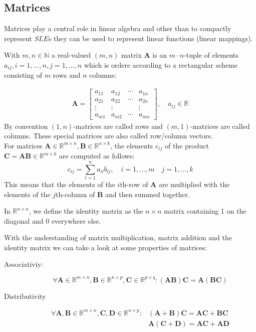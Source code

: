 \subsection*{Matrices}
Matrices play a central role in linear algebra and other than to compactly represent $SLE$s they can be used to represent linear functions (linear mappings).

\begin{definition}[Matrix]
    With $m,n \in \mathbb{N}$ a real-valued $(m,n)$ matrix \textbf{A} is an $m\cdot n$-tuple of elements $a_{ij}, i=1,\ldots,n, j=1,\ldots,n$ which is ordere according to a rectangular scheme consisting of $m$ rows and $n$ columns:
\end{definition}
\begin{align}
    \mathbf{A} =
    \begin{bmatrix}
        a_{11} & a_{12} & \cdots & a_{1n}\\
        a_{21} & a_{22} & \cdots & a_{2n}\\
        \vdots & \vdots &  & \vdots\\
        a_{m1} & a_{m2} & \cdots & a_{mn}
    \end{bmatrix}, \quad a_{ij} \in \mathbb{R}
\end{align}
By convention $(1,n)$-matrices are called rows and $(m,1)$-matrices are called columns. These special matrices are also called row/column vectors.\\
For matrices $\mathbf{A} \in \mathbb{R}^{m\times n},\mathbf{B} \in \mathbb{R}^{n\times k}$, the elements $c_{ij}$ of the product $\mathbf{C} = \mathbf{AB} \in \mathbb{R}^{m\times k}$ are computed as follows:
\[
    c_{ij}= \sum_{l=1}^{n}{a_{il}b_{lj}}, \quad i=1,\ldots,m \quad j=1, \ldots, k  
\]
This means that the elements of the $i$th-row of \textbf{A} are multiplied with the elements of the $j$th-column of \textbf{B} and then summed together.
\begin{definition}
    In $\mathbb{R}^{n\times n}$, we define the identity matrix as the $n \times n$ matrix containing 1 on the diagonal and 0 everywhere else. 
\end{definition}
With the understanding of matrix multiplication, matrix addition and the identity matrix we can take a look at some properties of matrices:
\begin{description}
    \item[Associativiy:]\[
        \forall \mathbf{A} \in \mathbb{R}^{m\times n}, \mathbf{B} \in \mathbb{R}^{n\times p}, \mathbf{C} \in \mathbb{R}^{p\times q}: (\mathbf{AB})\mathbf{C} = \mathbf{A}(\mathbf{BC})
    \]
    \item[Distributivity] \begin{align}
        \forall \mathbf{A,B} \in \mathbb{R}^{m\times n}, \mathbf{C,D} \in \mathbb{R}^{n\times p}: &(\mathbf{A}+\mathbf{B})\mathbf{C}= \mathbf{AC}+\mathbf{BC} \\ 
        &\mathbf{A}(\mathbf{C}+\mathbf{D})= \mathbf{AC}+\mathbf{AD}
    \end{align}
\end{description}
